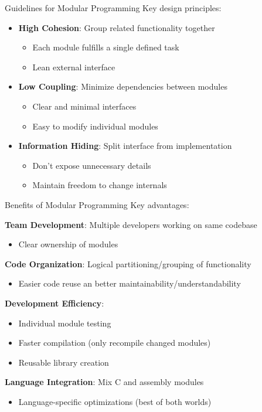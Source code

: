 \begin{theorem}{Guidelines for Modular Programming}
Key design principles:
\begin{itemize}
  \item \textbf{High Cohesion}: Group related functionality together
    \begin{itemize}
      \item Each module fulfills a single defined task
      \item Lean external interface
    \end{itemize}
  \item \textbf{Low Coupling}: Minimize dependencies between modules
    \begin{itemize}
      \item Clear and minimal interfaces
      \item Easy to modify individual modules
    \end{itemize}
  \item \textbf{Information Hiding}: Split interface from implementation
    \begin{itemize}
      \item Don't expose unnecessary details
      \item Maintain freedom to change internals
    \end{itemize}
\end{itemize}
\end{theorem}

\begin{corollary}{Benefits of Modular Programming}
Key advantages:

\textbf{Team Development}: Multiple developers working on same codebase
    \begin{itemize}
      \item Clear ownership of modules
    \end{itemize}
\textbf{Code Organization}: Logical partitioning/grouping of functionality
    \begin{itemize}
      \item Easier code reuse an better maintainability/understandability
    \end{itemize}
\textbf{Development Efficiency}:
    \begin{itemize}
      \item Individual module testing
      \item Faster compilation (only recompile changed modules)
      \item Reusable library creation
    \end{itemize}
\textbf{Language Integration}: Mix C and assembly modules
    \begin{itemize}
      \item Language-specific optimizations (best of both worlds)
    \end{itemize}
\end{corollary}

